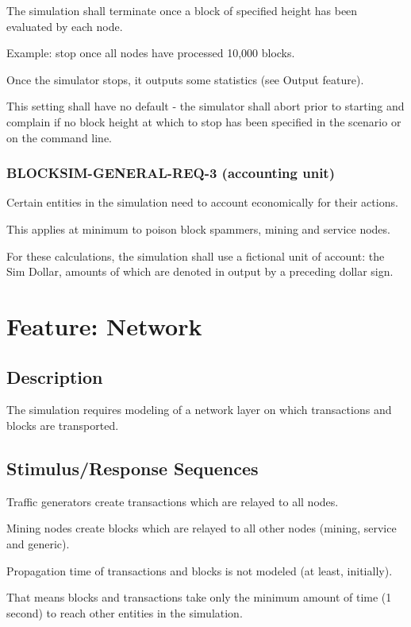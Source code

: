 \documentclass{scrreprt}
\begin{document}
The simulation shall terminate once a block of specified height has been
evaluated by each node.

Example: stop once all nodes have processed 10,000 blocks.

Once the simulator stops, it outputs some statistics (see Output feature).

This setting shall have no default - the simulator shall abort prior
to starting and complain if no block height at which to stop has been
specified in the scenario or on the command line.

\subsubsection{BLOCKSIM-GENERAL-REQ-3 (accounting unit)}

Certain entities in the simulation need to account economically for
their actions.

This applies at minimum to poison block spammers, mining and service nodes.

For these calculations, the simulation shall use a fictional unit of account:
the Sim Dollar, amounts of which are denoted in output by a preceding dollar sign.


\section{Feature: Network}

\subsection{Description}

The simulation requires modeling of a network layer on which
transactions and blocks are transported.


\subsection{Stimulus/Response Sequences}

Traffic generators create transactions which are relayed to all nodes.

Mining nodes create blocks which are relayed to all other nodes (mining, service and generic).

Propagation time of transactions and blocks is not modeled (at least, initially).

That means blocks and transactions take only the minimum amount of time (1 second) to
reach other entities in the simulation.
\end{document}

